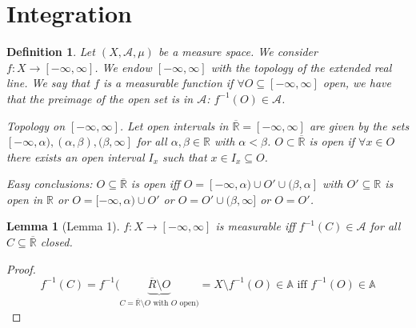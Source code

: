 \documentclass{article}
\newtheorem{definition}{Definition}  \numberwithin{definition}{section}
\newtheorem{lemma}{Lemma}  \numberwithin{lemma}{section}
\begin{document}
\section{Integration}

\begin{definition}
  Let $(X, \mathcal A, \mu)$ be a measure space.
  We consider $f: X \to [-\infty, \infty]$.
  We endow $[-\infty, \infty]$ with the topology of the extended real line.
  We say that $f$ is a measurable function if $\forall O \subseteq [-\infty, \infty]$ open, we have that the preimage of the open set is in $\mathcal A$: $f^{-1}(O) \in \mathcal A$.

  Topology on $[-\infty, \infty]$. Let open intervals in $\overline{\mathbb R} = [-\infty, \infty]$ are given by the sets $[-\infty, \alpha), (\alpha, \beta), (\beta, \infty]$ for all $\alpha, \beta \in \mathbb R$ with $\alpha < \beta$.
  $O \subset \overline{\mathbb R}$ is open if $\forall x \in O$ there exists an open interval $I_x$ such that
  $x \in I_x \subseteq O$.

  Easy conclusions:
  $O \subseteq \overline{\mathbb R}$ is open iff $O = [-\infty, \alpha) \cup O' \cup (\beta, \alpha]$ with $O' \subseteq \mathbb R$ is open in $\mathbb R$ or $O = [-\infty, \alpha) \cup O'$ or $O = O' \cup (\beta, \infty]$ or $O = O'$.
\end{definition}

\begin{lemma}[Lemma 1]
  $f: X \to [-\infty, \infty]$ is measurable iff $f^{-1}(C) \in \mathcal A$ for all $C \subseteq \overline{\mathbb R}$ closed.
\end{lemma}
\begin{proof}
  \[ f^{-1}(C) = f^{-1}(\underbrace{\overline{R} \setminus O}_{C = \overline{\mathbb R} \setminus O \text{ with } O \text{ open})} = X \setminus f^{-1}(O) \in \mathbb A \text{ iff } f^{-1}(O) \in \mathbb A \]
\end{proof}
\end{document}
